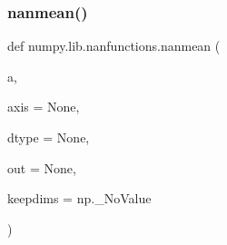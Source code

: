  \mbox{\label{namespacenumpy_1_1lib_1_1nanfunctions_a625e2e39b5b888f941c359b85f962022}} 
\subsubsection{\texorpdfstring{nanmean()}{nanmean()}}
{\footnotesize\ttfamily def numpy.\+lib.\+nanfunctions.\+nanmean (\begin{DoxyParamCaption}\item[{}]{a,  }\item[{}]{axis = {\ttfamily None},  }\item[{}]{dtype = {\ttfamily None},  }\item[{}]{out = {\ttfamily None},  }\item[{}]{keepdims = {\ttfamily np.\+\_\+NoValue} }\end{DoxyParamCaption})}

